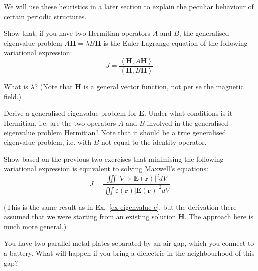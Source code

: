 We will use these heuristics in a later section to explain the peculiar behaviour of certain periodic structures.

\pagebreak

\begin{exer}
Show that, if you have two Hermitian operators $A$ and $B$, the generalised eigenvalue problem $A {\mathbf H} = \lambda B {\mathbf H}$ is the Euler-Lagrange equation of the following variational expression: \\

$$J = \frac{\left\langle {\mathbf H} , A {\mathbf H}\right\rangle}{\left\langle {\mathbf H} , B {\mathbf H}\right\rangle}$$

What is $\lambda$? (Note that ${\mathbf H}$ is a general vector function, not per se the magnetic field.)

\end{exer}

\begin{exer}
Derive a generalised eigenvalue problem for $\mathbf E$. Under what conditions is it Hermitian, i.e. are the two operators $A$ and $B$ involved in the generalised eigenvalue problem Hermitian? Note that it should be a true generalised eigenvalue problem, i.e. with $B$ not equal to the identity operator.

\end{exer}

\begin{exer}
Show based on the previous two exercises that minimising the following variational expression is equivalent to solving Maxwell's equations: \\

$$J=\frac{\iiint \left| \nabla \times {\mathbf E ({\mathbf r})} \right| ^2  dV} {\iiint \varepsilon({\mathbf r}) \left| {\mathbf E ({\mathbf r})} \right| ^2  dV}$$

(This is the same result as in Ex.~\ref{ex-eigenvalue-e}, but the derivation there assumed that we were starting from an existing solution $\mathbf H$. The approach here is much more general.)

\end{exer}

\begin{exer}

You have two parallel metal plates separated by an air gap, which you connect to a battery. What will happen if you bring a dielectric in the neighbourhood of this gap?
  
\end{exer}

